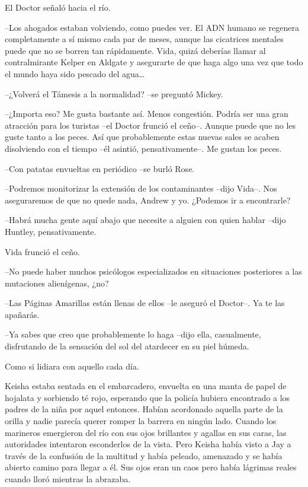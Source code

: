 {El Doctor señaló hacia el río.}

{--Los ahogados estaban volviendo, como puedes ver. El ADN humano se
 regenera completamente a sí mismo cada par de meses, aunque las
 cicatrices mentales puede que no se borren tan rápidamente. Vida, quizá
 deberías llamar al contralmirante Kelper en Aldgate y asegurarte de que
 haga algo una vez que todo el mundo haya sido pescado del agua\ldots{}}

{--¿Volverá el Támesis a la normalidad? --se preguntó Mickey.}

{--¿Importa eso? Me gusta bastante así. Menos congestión. Podría ser una
 gran atracción para los turistas --el Doctor frunció el ceño--. Aunque
 puede que no les guste tanto a los peces. Así que probablemente estas
 nuevas sales se acaben disolviendo con el tiempo --él asintió,
pensativamente--. Me gustan los peces.}

{--Con patatas envueltas en periódico --se burló Rose.}

{--Podremos monitorizar la extensión de los contaminantes --dijo Vida--.
 Nos aseguraremos de que no quede nada, Andrew y yo. ¿Podemos ir a
encontrarle?}

{--Habrá mucha gente aquí abajo que necesite a alguien con quien hablar
--dijo Huntley, pensativamente.}

{Vida frunció el ceño.}

{--No puede haber muchos psicólogos especializados en situaciones
posteriores a las mutaciones alienígenas, ¿no?}

{--Las Páginas Amarillas están llenas de ellos --le aseguró el Doctor--.
Ya te las apañarás.}

{--Ya sabes que creo que probablemente lo haga --dijo ella, casualmente,
disfrutando de la sensación del sol del atardecer en su piel húmeda.}

{Como si lidiara con aquello cada día.}

\mbox{}

{Keisha estaba sentada en el embarcadero, envuelta en una manta de papel
 de hojalata y sorbiendo té rojo, esperando que la policía hubiera
 encontrado a los padres de la niña por aquel entonces. Habían acordonado
 aquella parte de la orilla y nadie parecía querer romper la barrera en
 ningún lado. Cuando los marineros emergieron del río con sus ojos
 brillantes y agallas en sus caras, las autoridades intentaron
 esconderlos de la vista. Pero Keisha había visto a Jay a través de la
 confusión de la multitud y había peleado, amenazado y se había abierto
 camino para llegar a él. Sus ojos eran un caos pero había lágrimas
reales cuando lloró mientras la abrazaba.}

